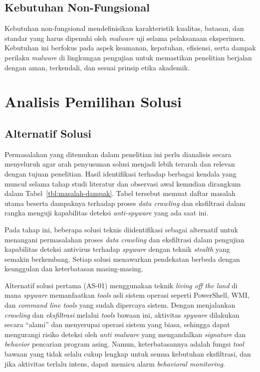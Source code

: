 

\subsection{Kebutuhan Non-Fungsional}
Kebutuhan non-fungsional mendefinisikan karakteristik kualitas, batasan, dan 
standar yang harus dipenuhi oleh \textit{malware} uji selama pelaksanaan 
eksperimen. Kebutuhan ini berfokus pada aspek keamanan, kepatuhan, efisiensi, 
serta dampak perilaku \textit{malware} di lingkungan pengujian untuk memastikan 
penelitian berjalan dengan aman, terkendali, dan sesuai prinsip etika akademik.



\section{Analisis Pemilihan Solusi }
\subsection{Alternatif Solusi}

Permasalahan yang ditemukan dalam penelitian ini perlu dianalisis secara menyeluruh agar arah penyusunan solusi menjadi lebih terarah dan relevan dengan tujuan penelitian. Hasil identifikasi terhadap berbagai kendala yang muncul selama tahap studi literatur dan observasi awal kemudian dirangkum dalam Tabel~\ref{tbl:masalah-dampak}. Tabel tersebut memuat daftar masalah utama beserta dampaknya terhadap proses \textit{data crawling} dan eksfiltrasi dalam rangka menguji kapabilitas deteksi \textit{anti-spyware} yang ada saat ini.



Pada tahap ini, beberapa solusi teknis diidentifikasi sebagai alternatif untuk 
menangani permasalahan proses \textit{data crawling} dan eksfiltrasi dalam 
pengujian kapabilitas deteksi antivirus terhadap \textit{spyware} dengan teknik 
\textit{stealth} yang semakin berkembang. Setiap solusi menawarkan pendekatan 
berbeda dengan keunggulan dan keterbatasan masing-masing.



Alternatif solusi pertama (AS-01) menggunakan teknik \textit{living off the land} 
di mana \textit{spyware} memanfaatkan \textit{tools} asli sistem operasi seperti 
PowerShell, WMI, dan \textit{command line tools} yang sudah dipercaya sistem. 
Dengan menjalankan \textit{crawling} dan \textit{eksfiltrasi} melalui \textit{tools} 
bawaan ini, aktivitas \textit{spyware} dilakukan secara “alami” dan menyerupai 
operasi sistem yang biasa, sehingga dapat mengurangi risiko deteksi oleh 
\textit{anti malware} yang mengandalkan \textit{signature} dan \textit{behavior} 
pencarian program asing. Namun, keterbatasannya adalah fungsi \textit{tool} 
bawaan yang tidak selalu cukup lengkap untuk semua kebutuhan eksfiltrasi, dan 
jika aktivitas terlalu intens, dapat memicu alarm \textit{behavioral monitoring}.

